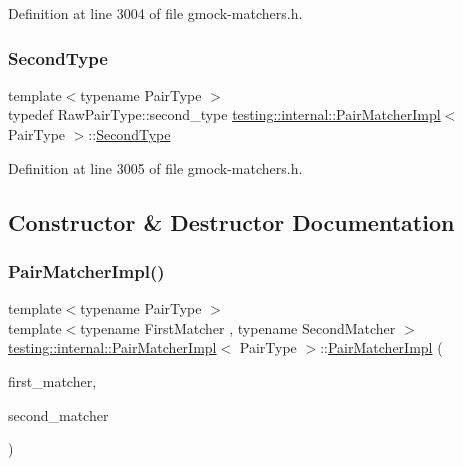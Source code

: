 Definition at line 3004 of file gmock-\/matchers.\+h.

\mbox{\label{classtesting_1_1internal_1_1PairMatcherImpl_ad63c9ff4f1aff81562efca293ff5aca9}} 
\subsubsection{\texorpdfstring{Second\+Type}{SecondType}}
{\footnotesize\ttfamily template$<$typename Pair\+Type $>$ \\
typedef Raw\+Pair\+Type\+::second\+\_\+type \hyperlink{classtesting_1_1internal_1_1PairMatcherImpl}{testing\+::internal\+::\+Pair\+Matcher\+Impl}$<$ Pair\+Type $>$\+::\hyperlink{classtesting_1_1internal_1_1PairMatcherImpl_ad63c9ff4f1aff81562efca293ff5aca9}{Second\+Type}}



Definition at line 3005 of file gmock-\/matchers.\+h.



\subsection{Constructor \& Destructor Documentation}
\mbox{\label{classtesting_1_1internal_1_1PairMatcherImpl_ae2615e785df46255c8695a5972ca510a}} 
\subsubsection{\texorpdfstring{Pair\+Matcher\+Impl()}{PairMatcherImpl()}}
{\footnotesize\ttfamily template$<$typename Pair\+Type $>$ \\
template$<$typename First\+Matcher , typename Second\+Matcher $>$ \\
\hyperlink{classtesting_1_1internal_1_1PairMatcherImpl}{testing\+::internal\+::\+Pair\+Matcher\+Impl}$<$ Pair\+Type $>$\+::\hyperlink{classtesting_1_1internal_1_1PairMatcherImpl}{Pair\+Matcher\+Impl} (\begin{DoxyParamCaption}\item[{First\+Matcher}]{first\+\_\+matcher,  }\item[{Second\+Matcher}]{second\+\_\+matcher }\end{DoxyParamCaption})\hspace{0.3cm}{\ttfamily [inline]}}



